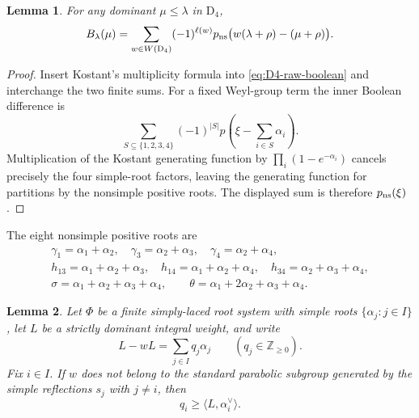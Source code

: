 \documentclass[11pt]{article}
\newtheorem{lemma}[lemma]{Lemma}
\theoremstyle{definition}
\theoremstyle{remark}
\newcommand{\typeD}{\ensuremath{\mathrm{D}}}
\begin{document}
\begin{lemma}\label{lem:D4-pns}
For any dominant $\mu\le\lambda$ in $\typeD_4$,
\begin{equation}\label{eq:D4-pns}
 B_\lambda(\mu)
  =\sum_{w\in W(\typeD_4)}(-1)^{\ell(w)}
    p_{\rm ns}\bigl(w(\lambda+\rho)-(\mu+\rho)\bigr).
\end{equation}
\end{lemma}

\begin{proof}
Insert Kostant's multiplicity formula into
\eqref{eq:D4-raw-boolean} and interchange the two finite sums.  For a fixed
Weyl-group term the inner Boolean difference is
\[
 \sum_{S\subseteq\{1,2,3,4\}}(-1)^{|S|}
 p\!\left(\xi-\sum_{i\in S}\alpha_i\right).
\]
Multiplication of the Kostant generating function by
$\prod_i(1-e^{-\alpha_i})$ cancels precisely the four simple-root factors,
leaving the generating function for partitions by the nonsimple positive
roots.  The displayed sum is therefore $p_{\rm ns}(\xi)$.
\end{proof}

The eight nonsimple positive roots are
\begin{equation}\label{eq:D4-nonsimple-roots}
\begin{gathered}
 \gamma_1=\alpha_1+\alpha_2,\quad
 \gamma_3=\alpha_2+\alpha_3,\quad
 \gamma_4=\alpha_2+\alpha_4,\\
 h_{13}=\alpha_1+\alpha_2+\alpha_3,\quad
 h_{14}=\alpha_1+\alpha_2+\alpha_4,\quad
 h_{34}=\alpha_2+\alpha_3+\alpha_4,\\
 \sigma=\alpha_1+\alpha_2+\alpha_3+\alpha_4,
 \qquad
 \theta=\alpha_1+2\alpha_2+\alpha_3+\alpha_4.
\end{gathered}
\end{equation}

\begin{lemma}
\label{lem:simply-laced-parabolic-bound}
Let $\Phi$ be a finite simply-laced root system with simple roots
$\{\alpha_j:j\in I\}$, let $L$ be a strictly dominant integral weight, and write
\[
       L-wL=\sum_{j\in I} q_j\alpha_j
       \qquad(q_j\in\mathbb Z_{\ge0}).
\]
Fix $i\in I$.  If $w$ does not belong to the standard parabolic subgroup
generated by the simple reflections $s_j$ with $j\ne i$, then
\begin{equation}\label{eq:simply-laced-parabolic-bound}
               q_i\ge \langle L,\alpha_i^\vee\rangle.
\end{equation}
\end{lemma}
\end{document}
